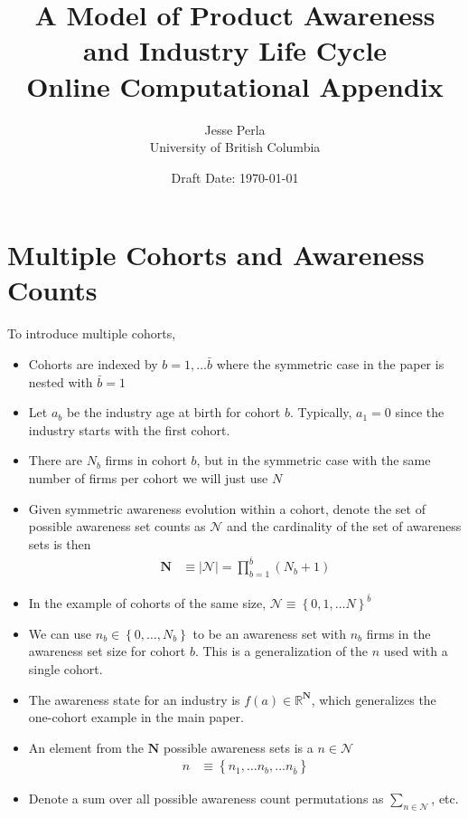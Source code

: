 \documentclass[12pt]{article}
\newcommand{\set}[1]{\ensuremath{\left\{{#1}\right\}}}
\newcommand{\R}{\ensuremath{\mathbb{R}}}
\newcommand{\abs}[1]{\ensuremath{\left| {#1}\right|}}
\begin{document}
\title{\Large A Model of Product Awareness and Industry Life Cycle\\
Online Computational  Appendix
}
\author{Jesse Perla \\ University of British Columbia}
\date{Draft Date: \today}
\maketitle
\appendix
\makeatletter
\def\@seccntformat#1{Appendix\ \csname the#1\endcsname\quad}
\makeatother
\makeatletter
\def\@seccntformat#1{\csname Pref@#1\endcsname \csname the#1\endcsname\quad}
\def\Pref@section{Appendix~}
\makeatother
{}

\section{Multiple Cohorts and Awareness Counts}\label{sec:cohort-notation}
To introduce multiple cohorts,
\begin{itemize}
	\item Cohorts are indexed by $ b = 1, \ldots \bar{b}$ where the symmetric case in the paper is nested with $\bar{b} = 1$
	\item Let $a_b$ be the industry age at birth for cohort $b$.  Typically, $a_1 = 0$ since the industry starts with the first cohort.
	\item There are $N_b$ firms in cohort $b$, but in the symmetric case with the same number of firms per cohort we will just use $N$
	\item Given symmetric awareness evolution within a cohort, denote the set of possible awareness set counts as $\mathcal{N}$ and the cardinality of the set of awareness sets is then
	\begin{align}
	\mathbf{N} &\equiv \abs{\mathcal{N}} = \prod_{b = 1}^{\bar{b}}(N_b + 1)
	\end{align}
	\item In the example of cohorts of the same size, $\mathcal{N} \equiv \set{0, 1,\ldots N}^{\bar{b}}$
	\item We can use $n_b \in \set{0, \ldots, N_b}$ to be an awareness set with $n_b$ firms in the awareness set size for cohort $b$.  This is a generalization of the $n$ used with a single cohort.	
	\item The awareness state for an industry is $f(a) \in \R^{\mathbf{N}}$, which generalizes the one-cohort example in the main paper.
	\item An element from the $\mathbf{N}$ possible awareness sets is a $n \in \mathcal{N}$
	\begin{align}
	n &\equiv \set{n_1, \ldots n_b, \ldots n_{\bar{b}}}
	\end{align}
	\item Denote a sum over all possible awareness count permutations as $\sum_{n \in \mathcal{N}}$, etc.
\end{itemize}
\end{document}

